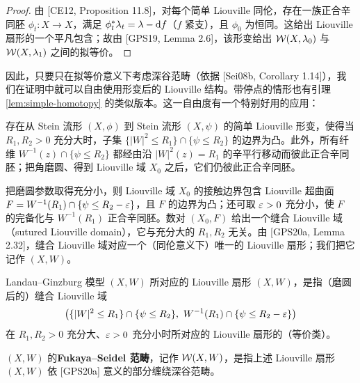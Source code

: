 \begin{proof}
由 [CE12, Proposition 11.8]，对每个简单 Liouville 同伦，存在一族正合辛同胚 $\phi_t\colon X\to X$，满足 $\phi_t^*\lambda_t=\lambda-\mathrm{d} f$（$f$ 紧支），且 $\phi_0$ 为恒同。这给出 Liouville 扇形的一个平凡包含；故由 [GPS19, Lemma 2.6]，该形变给出 $\mathcal{W}(X,\lambda_0)$ 与 $\mathcal{W}(X,\lambda_1)$ 之间的拟等价。
\end{proof}

因此，只要只在拟等价意义下考虑深谷范畴（依据 [Sei08b, Corollary 1.14]），我们在证明中就可以自由使用形变后的 Liouville 结构。带停点的情形也有引理 \ref{lem:simple-homotopy} 的类似版本。这一自由度有一个特别好用的应用：

\begin{proposition}\label{prop:convex-boundary}\label{prop:2-1-7}
存在从 Stein 流形 $(X,\phi)$ 到 Stein 流形 $(X,\psi)$ 的简单 Liouville 形变，使得当 $R_1,R_2>0$ 充分大时，子集 $\{|W|^2\le R_1\}\cap\{\psi\le R_2\}$ 的边界为凸。此外，所有纤维 $W^{-1}(z)\cap\{\psi\le R_2\}$ 都经由沿 $|W|^2(z)=R_1$ 的辛平行移动而彼此正合辛同胚；把角磨圆、得到 Liouville 域
$X_0$ 之后，它们仍彼此正合辛同胚。
\end{proposition}

把磨圆参数取得充分小，则 Liouville 域 $X_0$ 的接触边界包含 Liouville 超曲面 $F=W^{-1}(R_1)\cap\{\psi\le R_2-\varepsilon\}$，且 $F$ 的边界为凸；还可取 $\varepsilon>0$ 充分小，使 $F$ 的完备化与 $W^{-1}(R_1)$ 正合辛同胚。数对 $(X_0,F)$ 给出一个缝合 Liouville 域（sutured Liouville domain），它与充分大的 $R_1,R_2$ 无关。由 [GPS20a, Lemma 2.32]，缝合 Liouville 域对应一个（同伦意义下）唯一的 Liouville 扇形；我们把它记作 $(X,W)$。

\begin{definition}\label{def:liouville-sector}\label{def:2-1-8}
Landau--Ginzburg 模型 $(X,W)$ 所对应的 Liouville 扇形 $(X,W)$，是指（磨圆后的）缝合 Liouville 域
\[
\bigl(\{|W|^2\le R_1\}\cap\{\psi\le R_2\},\ W^{-1}(R_1)\cap\{\psi\le R_2-\varepsilon\}\bigr)
\]
在 $R_1,R_2>0$ 充分大、$\varepsilon>0$ 充分小时所对应的 Liouville 扇形的（等价类）。
\end{definition}

\begin{definition}\label{def:fs-category}\label{def:2-1-9}
$(X,W)$ 的\textbf{Fukaya--Seidel 范畴}，记作 $\mathcal{W}(X,W)$，是指上述 Liouville 扇形 $(X,W)$ 依 [GPS20a] 意义的部分缠绕深谷范畴。
\end{definition}


